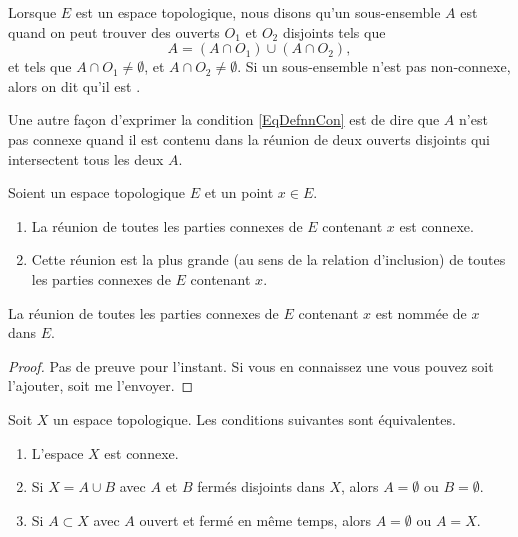 \begin{definition}  \label{DefIRKNooJJlmiD}
     Lorsque $E$ est un espace topologique, nous disons qu'un sous-ensemble $A$ est  quand on peut trouver des ouverts $O_1$ et $O_2$ disjoints tels que
    \begin{equation}    \label{EqDefnnCon}
        A=(A\cap O_1)\cup (A\cap O_2),
    \end{equation}
    et tels que $A\cap O_1\neq\emptyset$, et $A\cap O_2\neq\emptyset$. Si un sous-ensemble n'est pas non-connexe, alors on dit qu'il est .
\end{definition}
Une autre façon d'exprimer la condition \eqref{EqDefnnCon} est de dire que $A$ n'est pas connexe quand il est contenu dans la réunion de deux ouverts disjoints qui intersectent tous les deux $A$.

\begin{propositionDef}        \label{DEFooFHXNooJGUPPn}
    Soient un espace topologique \( E\) et un point \( x\in E\).
    \begin{enumerate}
        \item
            La réunion de toutes les parties connexes de \( E\) contenant $x$ est connexe. 
        \item
            Cette réunion est la plus grande (au sens de la relation d'inclusion) de toutes les parties connexes de \( E\) contenant $x$.
    \end{enumerate}
    La réunion de toutes les parties connexes de \( E\) contenant $x$ est nommée  de \( x\) dans \( E\).
\end{propositionDef}

\begin{proof}
    Pas de preuve pour l'instant. Si vous en connaissez une vous pouvez soit l'ajouter, soit me l'envoyer.
\end{proof}

\begin{proposition} \label{PropHSjJcIr}
    Soit \( X\) un espace topologique. Les conditions suivantes sont équivalentes.
    \begin{enumerate}
        \item
            L'espace \( X\) est connexe.
        \item
            Si \( X=A\cup B\) avec \( A\) et \( B\) fermés disjoints dans \( X\), alors \( A=\emptyset\) ou \( B=\emptyset\).
        \item       \label{ITEMooNIPZooIDPmEf}
            Si \( A\subset X\) avec \( A\) ouvert et fermé en même temps, alors \( A=\emptyset\) ou \( A=X\).
    \end{enumerate}
\end{proposition}

